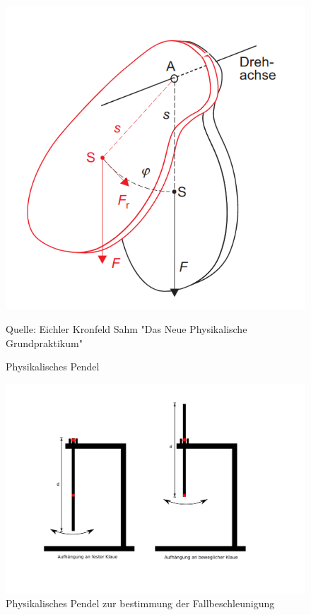\begin{figure}[ht]
    \centering
    \includegraphics[scale=0.3]{Pendel/Protokoll/fig/Physikalisches Pendel.png}
    \caption{Physikalisches Pendel}
    \label{fig:Physikalisches Pendel}
    Quelle: Eichler Kronfeld Sahm "Das Neue Physikalische Grundpraktikum"
\end{figure}

\begin{figure}[ht]
    \centering
    \includegraphics[scale=0.8]{Pendel/Protokoll/fig/Versuch 1.2.png}
    \caption{Physikalisches Pendel zur bestimmung der Fallbeschleunigung}
    \label{fig:Versuch 1.2}
\end{figure}


